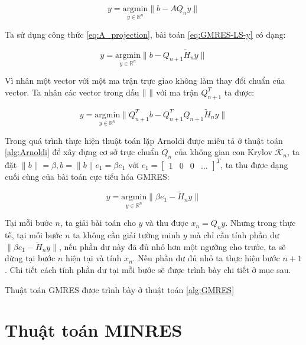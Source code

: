 \documentclass[14pt, a4paper]{article}
\numberwithin{equation}{section}
\numberwithin{algorithm}{section}
\numberwithin{figure}{section}
\numberwithin{dl}{section}
\numberwithin{md}{section}
\numberwithin{bd}{section}
\begin{document}
\begin{equation} \label{eq:GMRES-LS-y}
    y = \underset{y \in \mathbb{R}^{n}}{\mathrm{argmin}} \lVert b - A Q_n y \rVert
\end{equation}

Ta sử dụng công thức \ref{eq:A_projection}, bài toán \ref{eq:GMRES-LS-y} có dạng:

\begin{equation}
    y = \underset{y \in \mathbb{R}^{n}}{\mathrm{argmin}} \lVert b - Q_{n+1} \widetilde{H}_n y \rVert
\end{equation}

Vì nhân một vector với một ma trận trực giao không làm thay đổi chuẩn của vector. Ta nhân các vector trong dấu $\lVert \thickspace \rVert$ với ma trận $Q_{n+1}^T$ ta được:

\begin{equation}
    y = \underset{y \in \mathbb{R}^{n}}{\mathrm{argmin}} \lVert Q_{n+1}^T b - Q_{n+1}^T Q_{n+1} \widetilde{H}_n y \rVert
\end{equation}

Trong quá trình thực hiện thuật toán lặp Arnoldi được miêu tả ở thuật toán \ref{alg:Arnoldi} để xây dựng cơ sở trực chuẩn $Q_n$ của không gian con Krylov $\mathcal{K}_n$, ta đặt $\lVert b \rVert = \beta, b=\lVert b \rVert e_1=\beta e_1$ với $e_1 = \begin{bmatrix}
    1 & 0 & 0 & \dots
\end{bmatrix}^T$, ta thu được dạng cuối cùng của bài toán cực tiểu hóa GMRES:

\begin{equation}
    y = \underset{y \in \mathbb{R}^{n}}{\mathrm{argmin}} \lVert \beta e_1 - \widetilde{H}_n y \rVert
\end{equation}

Tại mỗi bước $n$, ta giải bài toán cho $y$ và thu được $x_n = Q_n y$. Nhưng trong thực tế, tại mỗi bước $n$ ta không cần giải tường minh $y$ mà chỉ cần tính phần dư $\lVert \beta e_1 - \widetilde{H}_n y \rVert$, nếu phần dư này đã đủ nhỏ hơn một ngưỡng cho trước, ta sẽ dừng tại bước $n$ hiện tại và tính $x_n$. Nếu phần dư đủ nhỏ ta thực hiện bước $n+1$. Chi tiết cách tính phần dư tại mỗi bước sẽ được trình bày chi tiết ở mục sau.

Thuật toán GMRES được trình bày ở thuật toán \ref{alg:GMRES}

\section{Thuật toán MINRES}
\end{document}
